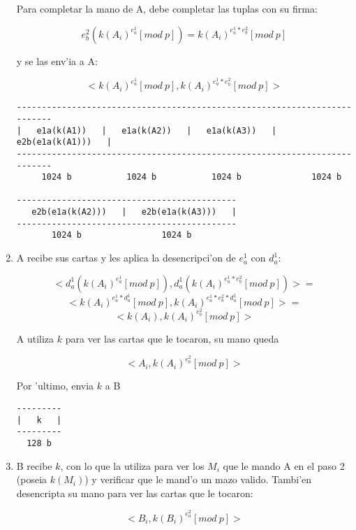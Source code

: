 \begin{enumerate}
Para completar la mano de A, debe completar las tuplas con su firma:

$$	e^2_b(k(A_i)^{e^1_a} [mod\ p]) =
	k(A_i)^{e^1_a * e^2_b} [mod\ p] $$
	
y se las env'ia a A:

$$	<k(A_i)^{e^1_a} [mod\ p],			k(A_i)^{e^1_a * e^2_b} [mod\ p]> $$
	

\begin{verbatim}
--------------------------------------------------------------------------
|   e1a(k(A1))   |   e1a(k(A2))   |   e1a(k(A3))   |   e2b(e1a(k(A1)))   |
--------------------------------------------------------------------------
     1024 b           1024 b           1024 b              1024 b         

--------------------------------------------
   e2b(e1a(k(A2)))   |   e2b(e1a(k(A3)))   |
--------------------------------------------
       1024 b                1024 b         
\end{verbatim}
	
	
	
	
	
\item A recibe sus cartas y les aplica la desencripci'on de $e^1_a$ con $d^1_a$:

$$	<d^1_a(k(A_i)^{e^1_a} [mod\ p]),			d^1_a(k(A_i)^{e^1_a * e^2_b} [mod\ p])> = $$
$$	<k(A_i)^{e^1_a * d^1_a} [mod\ p],			k(A_i)^{e^1_a * e^2_b * d^1_a} [mod\ p]> = $$
$$	<k(A_i),								k(A_i)^{e^2_b} [mod\ p]> $$
	
A utiliza $k$ para ver las cartas que le tocaron, su mano queda

$$	<A_i, k(A_i)^{e^2_b} [mod\ p]> $$

Por 'ultimo, envia $k$ a B


\begin{verbatim}
---------
|   k   |
---------
  128 b
\end{verbatim}

	 
	 
	 


\item B recibe $k$, con lo que la utiliza para ver los $M_i$ que le mando A en el paso 2 (poseia $k(M_i)$) y verificar que le mand'o un mazo valido. Tambi'en desencripta su mano para ver las cartas que le tocaron:

$$	<B_i, k(B_i)^{e^2_a} [mod\ p]> $$
	
\end{enumerate}	




